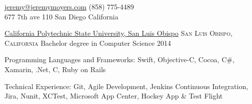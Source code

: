 \documentclass[10pt,a4paper]{article}
\begin{document}
\sloppy  %



\nobreakvspace{0.3em}  %

\noindent\href{mailto:jeremy.at.jeremymoyers.coml}{jeremy\mbox{}@\mbox{}jeremymoyers.com}\sbull
(858) 775-4489
\\
677 7th ave 110\sbull
San Diego\thinspace {\large \sc }\sbull
California

\spacedhrule{0.9em}{-0.4em}  %


\headedsection
  {\href{https://www.calpoly.edu}{California Polytechnic State University, San Luis Obispo}}
  {\textsc{San Luis Obispo, California}} {%
  \headedsubsection
    {Bachelor degree in Computer Science}
    {2014}
    {\bodytext{}}
}
\vspace{-0.8em}


\spacedhrule{0.5em}{-0.4em}


\inlineheadsection  %
  {Programming Languages and Frameworks:}
  {Swift, Objective-C, Cocoa, C\#, Xamarin, .Net, C, Ruby on Rails }

\vspace{0.5em}
\inlineheadsection
  {Technical Experience:}
  {Git, Agile Development, Jenkins Continuous Integration, Jira, Nunit, XCTest, Microsoft App Center, Hockey App \& Test Flight }


\spacedhrule{1.6em}{-0.4em}

\end{document}
